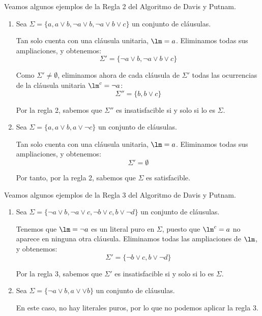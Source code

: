 \begin{ejemplo}
    Veamos algunos ejemplos de la Regla 2 del Algoritmo de Davis y Putnam.
    \begin{enumerate}
        \item Sea $\Sigma = \{a,a\lor b,\lnot a\lor b,\lnot a\lor b\lor c\}$ un conjunto de cláusulas.
        
        Tan solo cuenta con una cláusula unitaria, $\lm=a$. Eliminamos todas sus ampliaciones, y obtenemos:
        \begin{equation*}
            \Sigma' = \{\lnot a\lor b,\lnot a\lor b\lor c\}
        \end{equation*}

        Como $\Sigma'\neq \emptyset$, eliminamos ahora de cada cláusula de $\Sigma'$ todas las ocurrencias de la cláusula unitaria $\lm^c = \lnot a$:
        \begin{equation*}
            \Sigma'' = \{b,b\lor c\}
        \end{equation*}

        Por la regla 2, sabemos que $\Sigma''$ es insatisfacible si y solo si lo es $\Sigma$.

        \item Sea $\Sigma = \{a, a\lor b,a\lor \lnot c\}$ un conjunto de cláusulas.
        
        Tan solo cuenta con una cláusula unitaria, $\lm=a$. Eliminamos todas sus ampliaciones, y obtenemos:
        \begin{equation*}
            \Sigma' = \emptyset
        \end{equation*}

        Por tanto, por la regla 2, sabemos que $\Sigma$ es satisfacible.
    \end{enumerate}
\end{ejemplo}


\begin{ejemplo}
    Veamos algunos ejemplos de la Regla 3 del Algoritmo de Davis y Putnam.
    \begin{enumerate}
        \item Sea $\Sigma = \{\lnot a\lor b, \lnot a\lor c,\lnot b\lor c,b\lor \lnot d\}$ un conjunto de cláusulas.
        
        Tenemos que $\lm=\lnot a$ es un literal puro en $\Sigma$, puesto que $\lm^c=a$ no aparece en ninguna otra cláusula.
        Eliminamos todas las ampliaciones de $\lm$, y obtenemos:
        \begin{equation*}
            \Sigma' = \{\lnot b\lor c,b\lor \lnot d\}
        \end{equation*}

        Por la regla 3, sabemos que $\Sigma'$ es insatisfacible si y solo si lo es $\Sigma$.

        \item Sea $\Sigma = \{\lnot a\lor b, a\lor \lor b\}$ un conjunto de cláusulas.
        
        En este caso, no hay literales puros, por lo que no podemos aplicar la regla 3.
    \end{enumerate}
\end{ejemplo}


